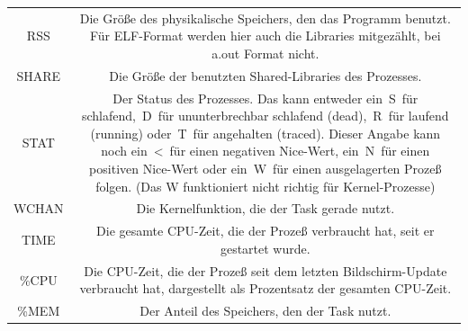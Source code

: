 \documentclass[a4paper]{article}
\begin{document}
\begin{tabular}{c|c}
    RSS     & Die Größe des physikalische Speichers, den das Programm benutzt. Für ELF-Format werden hier auch die Libraries mitgezählt, bei a.out Format nicht.                                                                                                                                                                                                                         \\
    SHARE   & Die Größe der benutzten Shared-Libraries des Prozesses.                                                                                                                                                                                                                                                                                                                    \\
    STAT    & Der Status des Prozesses. Das kann entweder ein S für schlafend, D für ununterbrechbar schlafend (dead), R für laufend (running) oder T für angehalten (traced). Dieser Angabe kann noch ein < für einen negativen Nice-Wert, ein N für einen positiven Nice-Wert oder ein W für einen ausgelagerten Prozeß folgen. (Das W funktioniert nicht richtig für Kernel-Prozesse) \\
    WCHAN   & Die Kernelfunktion, die der Task gerade nutzt.                                                                                                                                                                                                                                                                                                                             \\
    TIME    & Die gesamte CPU-Zeit, die der Prozeß verbraucht hat, seit er gestartet wurde.                                                                                                                                                                                                                                                                                              \\
    \%CPU   & Die CPU-Zeit, die der Prozeß seit dem letzten Bildschirm-Update verbraucht hat, dargestellt als Prozentsatz der gesamten CPU-Zeit.                                                                                                                                                                                                                                         \\
    \%MEM   & Der Anteil des Speichers, den der Task nutzt.                                                                                                                                                                                                                                                                                                                              \\

\end{tabular}
\end{document}
